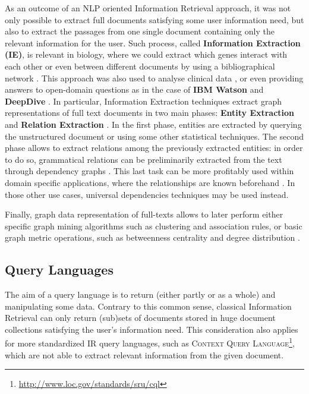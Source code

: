 As an outcome of an NLP oriented Information Retrieval approach, it was  not only possible to extract full documents satisfying some user information need, but also to extract the passages from one single document containing only the relevant information for the user. Such process, called \textbf{Information Extraction (IE)}, is relevant in  biology, where we could extract which genes interact with each other \cite{MalloryZRA16} or even between different documents by using a bibliographical network \cite{Song14Discovering}. This approach was also used to analyse  clinical data \cite{medical}, or even providing answers to open-domain questions as in the case of \textbf{IBM Watson} \cite{IBMWatson} and \textbf{DeepDive} \cite{PalomaresAKR16}. 
In particular, {Information Extraction} techniques extract graph representations of full text documents in two main phases: \textbf{Entity Extraction} and \textbf{Relation Extraction} \cite{Sarawagi}. In the first phase, entities are extracted by querying the unstructured document  or using some other statistical techniques. The second phase allows to extract relations among the previously extracted entities: in order to do so, grammatical relations can be preliminarily extracted from the text through dependency graphs \cite{MarneffeDSHGNM14}.
This last task can be more profitably used within domain specific applications, where the relationships are known beforehand \cite{ZhangRCSWW17}. In those other use cases, universal dependencies techniques may be used instead.

Finally, graph data representation of full-texts allows to later perform either specific graph mining algorithms \cite{Samatova} such as clustering \cite{Chen10} and association rules, or basic graph metric operations, such as betweenness centrality and degree distribution \cite{Newman}. 
	
\subsection{Query Languages}\label{subsec:unstructlang}
The aim of a query language is to return (either partly or as a whole) and manipulating some data. Contrary to this common sense, classical Information Retrieval \cite{Manning} can only return (sub)sets of documents stored in huge document collections satisfying the user's information need. This consideration also applies for more standardized IR query languages, such as  \textsc{Context Query Language}\footnote{\url{http://www.loc.gov/standards/sru/cql}}, which are not able to extract relevant information from the given document.

